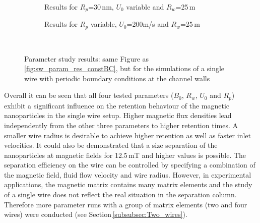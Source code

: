 \begin{figure}
\begin{subfigure}{0.49\textwidth}
                  \caption{Results for $R_{p}$=30\,nm, $U_{0}$ variable and $R_{w}$=25\,\textmu m}\label{subfig:sw_periodicBC_U0_var}
          \end{subfigure}\hfill
        \begin{subfigure}{0.49\textwidth}
                \flushright
                \caption{Results for $R_{p}$ variable, $U_{0}$=200\textmu m/s and $R_{w}$=25\,\textmu m}\label{subfig:sw_periodicBC_Rp_var}
        \end{subfigure}
        \\
        
        \caption[Parameter study results of the simulated retention of nanoparticles on a single wire with a periodic boundary condition at the channel walls]{Parameter study results: same Figure as \ref{fig:sw_param_res_constBC}, but for the simulations of a single wire with periodic boundary conditions at the channel walls}
        \label{fig:sw_param_res_periodicBC}
  \end{figure}

\FloatBarrier
Overall it can be seen that all four tested parameters ($B_{0}$, $R_{w}$, $U_{0}$ and $R_{p}$) exhibit a significant influence on the retention behaviour of the magnetic nanoparticles in the single wire setup. Higher magnetic flux densities lead independently from the other three parameters to higher retention times. A smaller wire radius is desirable to achieve higher retention as well as faster inlet velocities. It could also be demonstrated that a size separation of the nanoparticles at magnetic fields for 12.5\,mT and higher values is possible. The separation efficiency on the wire can be controlled by specifying a combination of the magnetic field, fluid flow velocity and wire radius. However, in experimental applications, the magnetic matrix contains many matrix elements and the study of a single wire does not reflect the real situation in the separation column. Therefore more parameter runs with a group of matrix elements (two and four wires) were conducted (see Section\,\ref{subsubsec:Two_wires}).   

